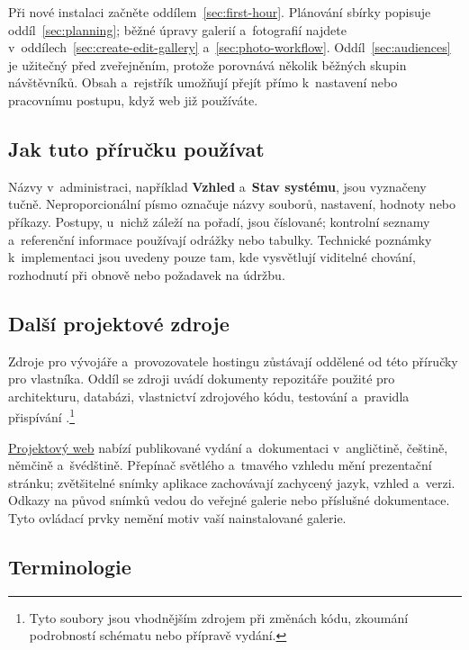 \documentclass[11pt,a4paper]{article}
\newcommand{\ui}[1]{\textbf{#1}}
\begin{document}
Při nové instalaci začněte oddílem~\ref{sec:first-hour}. Plánování sbírky
popisuje oddíl~\ref{sec:planning}; běžné úpravy galerií a~fotografií najdete
v~oddílech~\ref{sec:create-edit-gallery} a~\ref{sec:photo-workflow}.
Oddíl~\ref{sec:audiences} je užitečný před zveřejněním, protože porovnává
několik běžných skupin návštěvníků. Obsah a~rejstřík umožňují přejít přímo
k~nastavení nebo pracovnímu postupu, když web již používáte.

\subsection{Jak tuto příručku používat}

Názvy v~administraci, například \ui{Vzhled} a~\ui{Stav systému}, jsou vyznačeny
tučně. Neproporcionální písmo označuje názvy souborů, nastavení, hodnoty nebo
příkazy. Postupy, u~nichž záleží na pořadí, jsou číslované; kontrolní seznamy
a~referenční informace používají odrážky nebo tabulky. Technické poznámky
k~implementaci jsou uvedeny pouze tam, kde vysvětlují viditelné chování,
rozhodnutí při obnově nebo požadavek na údržbu.

\subsection{Další projektové zdroje}

Zdroje pro vývojáře a~provozovatele hostingu zůstávají oddělené od této příručky
pro vlastníka. Oddíl se zdroji uvádí dokumenty repozitáře použité pro
architekturu, databázi, vlastnictví zdrojového kódu, testování a~pravidla
přispívání
\cite{readme,architecture,database,codemap,testing,agents}.\footnote{Tyto
soubory jsou vhodnějším zdrojem při změnách kódu, zkoumání podrobností schématu
nebo přípravě vydání.}

\href{https://phpgallery.site/}{Projektový web} nabízí
publikované vydání a~dokumentaci v~angličtině, češtině, němčině a~švédštině.
Přepínač světlého a~tmavého vzhledu mění prezentační stránku; zvětšitelné
snímky aplikace zachovávají zachycený jazyk, vzhled a~verzi. Odkazy na původ
snímků vedou do veřejné galerie nebo příslušné dokumentace. Tyto ovládací
prvky nemění motiv vaší nainstalované galerie.

\subsection{Terminologie}
\end{document}
